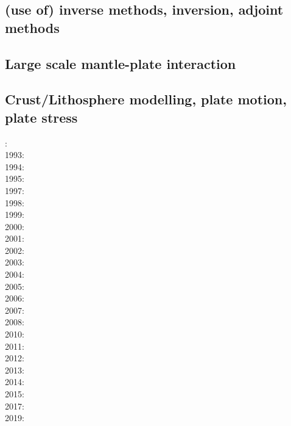 \cite{rola77}
\cite{zhou08}


\subsection*{(use of) inverse methods, inversion, adjoint methods}

\cite{buht03}
\cite{wama09}
\cite{wosp14}\cite{hobo14}
\cite{wahg15}
\cite{ghbu16}
\cite{ligs17}

\subsection*{Large scale mantle-plate interaction}

\cite{algs12}

\subsection*{Crust/Lithosphere modelling, plate motion, plate stress}

: \cite{daco88}\\
1993: \cite{nefo93}\cite{brau93}\\
1994: \cite{buso94}\\
1995: \cite{belg95}\cite{brbe95}\\
1997: \cite{thsj97}\cite{babr97}\cite{bucl97}\\
1998: \cite{bird98}\cite{lecd98}\\
1999: \cite{will99b}\cite{bird99}\\
2000: \cite{hanl00}\cite{labp00}\\
2001: \cite{homo01}\cite{beoc01}\\
2002: \cite{labu02}\cite{coli02}\cite{bast02}\\
2003: \cite{wipo03}\cite{wabu03}\\
2004: \cite{tibb04}\\
2005: \cite{hagu05}\cite{wiwg05}\\
2006: \cite{libi06}\cite{bube06}\cite{basv06}\\
2007: \cite{afrf07}\\
2008: \cite{affr08}\cite{tibb08}\cite{hapo08}\cite{busc08}\\
2010: \cite{hamo10}\\
2011: \cite{rera11}\\
2012: \cite{wagw12}\cite{vacl12}\cite{buit12}\\
2013: \cite{wazh13}\\
2014: \cite{kava14}\cite{dusp14}\cite{rugb14}\cite{wavp14}\cite{whbb14}\cite{scml14}\\
2015: \cite{wavp15}\cite{thkp15}\\
2017: \cite{rugb17}\\
2019: \cite{koen19}

